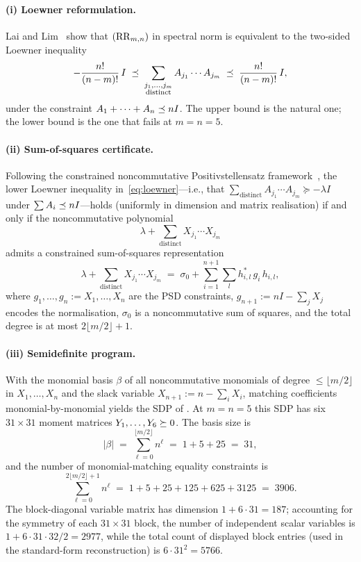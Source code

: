 \paragraph{(i) Loewner reformulation.}
Lai and Lim~\cite[Conjecture~1A]{LaiLim2020} show that $(\mathrm{RR}_{m,n})$
in spectral norm is equivalent to the two-sided Loewner inequality
\begin{equation}
  -\frac{n!}{(n-m)!}\,I
  \;\preceq\;
  \sum_{\substack{j_1,\dots,j_m\\\text{distinct}}}
    A_{j_1}\cdots A_{j_m}
  \;\preceq\;
  \frac{n!}{(n-m)!}\,I,
  \label{eq:loewner}
\end{equation}
under the constraint $A_1+\cdots+A_n \preceq nI$.  The upper bound
is the natural one; the lower bound is the one that fails at $m=n=5$.

\paragraph{(ii) Sum-of-squares certificate.}
Following the constrained noncommutative Positivstellensatz
framework~\cite{Helton2002,LaiLim2020}, the lower Loewner
inequality in~\eqref{eq:loewner}---i.e., that
$\sum_{\text{distinct}}A_{j_1}\cdots A_{j_m}\succeq -\lambda I$
under $\sum A_i\preceq nI$---holds
(uniformly in dimension and matrix realisation) if and only if the
noncommutative polynomial
\[
  \lambda + \sum_{\text{distinct}} X_{j_1}\cdots X_{j_m}
\]
admits a constrained sum-of-squares representation
\[
  \lambda + \sum_{\text{distinct}} X_{j_1}\cdots X_{j_m}
  \;=\; \sigma_0 + \sum_{i=1}^{n+1} \sum_{l} h_{i,l}^{*}\, g_i\, h_{i,l},
\]
where $g_1,\dots,g_n := X_1,\dots,X_n$ are the PSD constraints,
$g_{n+1} := nI-\sum_j X_j$ encodes the normalisation, $\sigma_0$ is a
noncommutative sum of squares, and the total degree is at most
$2\lfloor m/2\rfloor+1$.

\paragraph{(iii) Semidefinite program.}
With the monomial basis $\beta$ of all noncommutative monomials of
degree $\le \lfloor m/2\rfloor$ in $X_1,\dots,X_n$ and the slack
variable $X_{n+1}:=n - \sum_i X_i$, matching coefficients
monomial-by-monomial yields the SDP of
\cite[Conjecture~1C]{LaiLim2020}.  At $m=n=5$ this SDP has six
$31\times 31$ moment matrices $Y_1,\dots,Y_6\succeq 0$.  The basis size is
\[
  \lvert\beta\rvert
  \;=\;\sum_{\ell=0}^{\lfloor m/2\rfloor} n^{\ell}
  \;=\;1+5+25\;=\;31,
\]
and the number of monomial-matching equality constraints is
\[
  \sum_{\ell=0}^{2\lfloor m/2\rfloor+1} n^{\ell}
  \;=\;1+5+25+125+625+3125\;=\;3906.
\]
The block-diagonal variable matrix has dimension
$1 + 6\cdot 31 = 187$; accounting for the symmetry of each
$31{\times}31$ block, the number of independent scalar
variables is $1 + 6\cdot 31\cdot 32/2 = 2977$, while the
total count of displayed block entries (used in the standard-form
reconstruction) is $6\cdot 31^{2} = 5766$.


